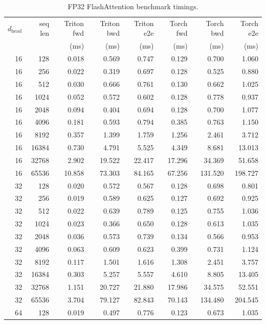 \documentclass[11pt]{article}
\begin{document}
\begin{table}[H]
\centering
\scriptsize
\caption{FP32 FlashAttention benchmark timings.}
\setlength{\tabcolsep}{2pt}
\begin{tabular}{rrrrrrrr}
\toprule
$d_{\text{head}}$ & seq len & Triton fwd & Triton bwd & Triton e2e & Torch fwd & Torch bwd & Torch e2e \\
 &  & (ms) & (ms) & (ms) & (ms) & (ms) & (ms) \\
\midrule
16 & 128 & 0.018 & 0.569 & 0.747 & 0.129 & 0.700 & 1.060 \\
16 & 256 & 0.022 & 0.319 & 0.697 & 0.128 & 0.525 & 0.880 \\
16 & 512 & 0.030 & 0.666 & 0.761 & 0.130 & 0.662 & 1.025 \\
16 & 1024 & 0.052 & 0.572 & 0.602 & 0.128 & 0.778 & 0.937 \\
16 & 2048 & 0.094 & 0.404 & 0.694 & 0.128 & 0.700 & 1.077 \\
16 & 4096 & 0.181 & 0.593 & 0.794 & 0.385 & 0.763 & 1.150 \\
16 & 8192 & 0.357 & 1.399 & 1.759 & 1.256 & 2.461 & 3.712 \\
16 & 16384 & 0.730 & 4.791 & 5.525 & 4.349 & 8.681 & 13.013 \\
16 & 32768 & 2.902 & 19.522 & 22.417 & 17.296 & 34.369 & 51.658 \\
16 & 65536 & 10.858 & 73.303 & 84.165 & 67.256 & 131.520 & 198.727 \\
32 & 128 & 0.020 & 0.572 & 0.567 & 0.128 & 0.698 & 0.801 \\
32 & 256 & 0.019 & 0.589 & 0.625 & 0.127 & 0.692 & 0.925 \\
32 & 512 & 0.022 & 0.639 & 0.789 & 0.125 & 0.755 & 1.036 \\
32 & 1024 & 0.023 & 0.366 & 0.650 & 0.128 & 0.613 & 1.035 \\
32 & 2048 & 0.036 & 0.573 & 0.739 & 0.134 & 0.566 & 0.953 \\
32 & 4096 & 0.063 & 0.609 & 0.623 & 0.399 & 0.731 & 1.124 \\
32 & 8192 & 0.117 & 1.501 & 1.616 & 1.308 & 2.451 & 3.757 \\
32 & 16384 & 0.303 & 5.257 & 5.557 & 4.610 & 8.805 & 13.405 \\
32 & 32768 & 1.151 & 20.727 & 21.880 & 17.986 & 34.575 & 52.551 \\
32 & 65536 & 3.704 & 79.127 & 82.843 & 70.143 & 134.480 & 204.545 \\
64 & 128 & 0.019 & 0.497 & 0.776 & 0.123 & 0.673 & 1.035 \\

\end{tabular}
\end{table}
\end{document}
